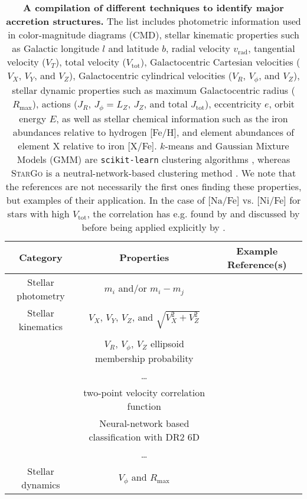 \begin{table*}    \centering
    \caption{
    \textbf{A compilation of different techniques to identify major accretion structures.}
    The list includes photometric information used in color-magnitude diagrams (CMD), stellar kinematic properties such as Galactic longitude $l$ and latitude $b$, radial velocity $v_\text{rad}$, tangential velocity ($V_T$), total velocity ($V_\text{tot}$), Galactocentric Cartesian velocities ($V_X$, $V_Y$, and $V_Z$), Galactocentric cylindrical velocities ($V_R$, $V_\phi$, and $V_Z$), stellar dynamic properties such as maximum Galactocentric radius ($R_\text{max}$), actions ($J_R$, $J_\phi = L_Z$, $J_Z$, and total $J_\text{tot}$), eccentricity $e$, orbit energy $E$, as well as stellar chemical information such as the iron abundances relative to hydrogen [Fe/H], and element abundances of element X relative to iron [X/Fe]. $k$-means and Gaussian Mixture Models (GMM) are \texttt{scikit-learn} clustering algorithms \citep{scikit-learn}, whereas \textsc{StarGo} is a neutral-network-based clustering method \citet{Yuan2018}.
    We note that the references are not necessarily the first ones finding these properties, but examples of their application. In the case of [Na/Fe] vs. [Ni/Fe] for stars with high $V_\text{tot}$, the correlation has e.g. found by \citet{Nissen1997,Nissen2010} and discussed by \citet{Venn2004} before being applied explicitly by \citet{Bensby2014}.
    }
    \begin{tabular}{c|c|c}
        \hline \hline
        Category & Properties & Example Reference(s) \\
        \hline
        Stellar photometry & $m_i$ and/or $m_i - m_j$ & \citet{Belokurov2006} \\
        \hline
        Stellar kinematics & $V_X$, $V_Y$, $V_Z$, and $\sqrt{V_X^2+V_Z^2}$ & \citet{Koppelman2018} \\
		& $V_R$, $V_\phi$, $V_Z$ ellipsoid membership probability & \citet{Carollo2010} \\
		& \dots & \citet{Ishigaki2012, Ishigaki2013} \\
		& two-point velocity correlation function & \citet{ReFiorentin2015} \\
		& Neural-network based classification with \Gaia DR2 6D & \citet{Ostdiek2020} \\
		& \dots & \citet{Necib2020} \\
        \hline
        Stellar dynamics & $V_\phi$ and $R_\text{max}$ & \citet{Gratton2003} \\

\end{tabular}
\end{table*}
